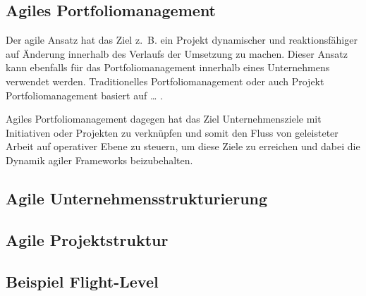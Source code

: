 \subsection{Agiles Portfoliomanagement}
Der agile Ansatz hat das Ziel z. B. ein Projekt dynamischer und reaktionsfähiger auf Änderung innerhalb des Verlaufs der Umsetzung zu machen. Dieser Ansatz kann ebenfalls für das Portfoliomanagement innerhalb eines Unternehmens verwendet werden. Traditionelles Portfoliomanagement oder auch Projekt Portfoliomanagement basiert auf … \cite{}.

Agiles Portfoliomanagement dagegen hat das Ziel Unternehmensziele mit Initiativen oder Projekten zu verknüpfen und somit den Fluss von geleisteter Arbeit auf operativer Ebene zu steuern, um diese Ziele zu erreichen und dabei die Dynamik agiler Frameworks beizubehalten. \cite{}


\subsection{Agile Unternehmensstrukturierung}

\subsection{Agile Projektstruktur}

\subsection{Beispiel Flight-Level}
